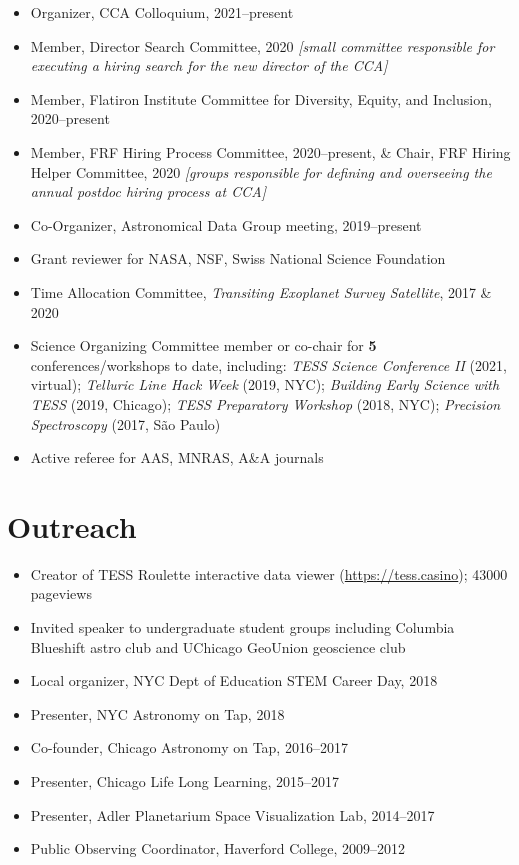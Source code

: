 \documentclass{clean_cv}
\begin{document}
\begin{itemize}
    \item Organizer, CCA Colloquium, 2021--present
    \item Member, Director Search Committee, 2020 \textit{[small committee responsible for executing a hiring search for the new director of the CCA]}
    \item Member, Flatiron Institute Committee for Diversity, Equity, and Inclusion, 2020--present
    \item Member, FRF Hiring Process Committee, 2020--present, \& Chair, FRF Hiring Helper Committee, 2020 \textit{[groups responsible for defining and overseeing the annual postdoc hiring process at CCA]}
    \item Co-Organizer, Astronomical Data Group meeting, 2019--present
    \item Grant reviewer for NASA, NSF, Swiss National Science Foundation
    \item Time Allocation Committee, \textit{Transiting Exoplanet Survey Satellite}, 2017 \& 2020
    \item Science Organizing Committee member or co-chair for \textbf{5} conferences/workshops to date, including: \textit{TESS Science Conference II} (2021, virtual); \textit{Telluric Line Hack Week} (2019, NYC); \textit{Building Early Science with TESS} (2019, Chicago); \textit{TESS Preparatory Workshop} (2018, NYC); \textit{Precision Spectroscopy} (2017, S\~{a}o Paulo)
    \item Active referee for AAS, MNRAS, A\&A journals
\end{itemize}

\section{Outreach}
\begin{itemize}
    \item Creator of TESS Roulette interactive data viewer (\href{https://tess.casino}{https://tess.casino}); 43000 pageviews
    \item Invited speaker to undergraduate student groups including Columbia Blueshift astro club and UChicago GeoUnion geoscience club
    \item Local organizer, NYC Dept of Education STEM Career Day, 2018
    \item Presenter, NYC Astronomy on Tap, 2018
    \item Co-founder, Chicago Astronomy on Tap, 2016--2017
    \item Presenter, Chicago Life Long Learning, 2015--2017
    \item Presenter, Adler Planetarium Space Visualization Lab, 2014--2017
    \item Public Observing Coordinator, Haverford College, 2009--2012
\end{itemize}
\end{document}

